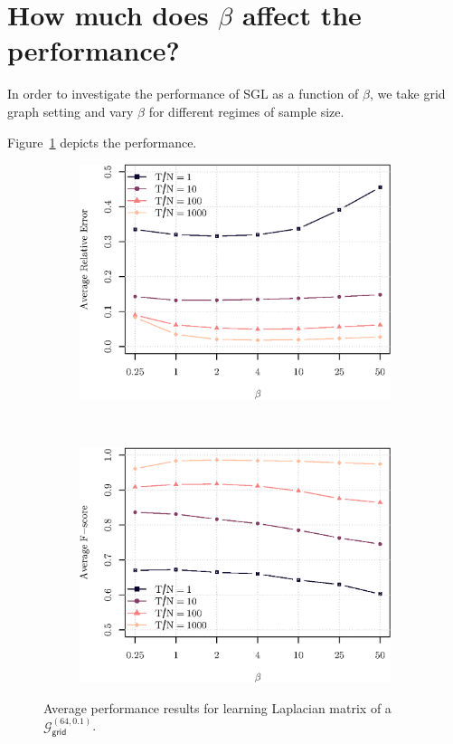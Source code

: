 \section{How much does $\beta$ affect the performance?}
In order to investigate the performance of \textsf{SGL} as a function of $\beta$, we take grid graph
setting and vary $\beta$ for different regimes of sample size.

Figure~\ref{fig:performance-beta} depicts the performance.

\begin{figure}[!htb]
    \centering
    \begin{subfigure}[b]{0.47\textwidth}
        \includegraphics[width=\textwidth]{beta-eval/relative_error_beta.eps}
    \end{subfigure}
    ~ %
    \begin{subfigure}[b]{0.47\textwidth}
        \includegraphics[width=\textwidth]{beta-eval/fscore_beta.eps}
    \end{subfigure}
    \caption{Average performance results for learning Laplacian matrix of a $\mathcal{G}^{(64, 0.1)}_{\mathsf{grid}}$.}
    \label{fig:performance-beta}
\end{figure}

